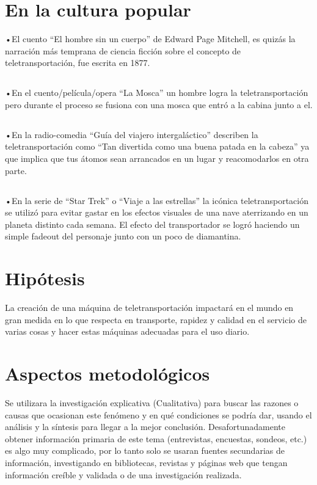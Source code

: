 \documentclass{bmcart}
\begin{document}
\section*{En la cultura popular}
•El cuento “El hombre sin un cuerpo” de Edward Page Mitchell, es quizás la narración más temprana de ciencia ficción sobre el concepto de teletransportación, fue escrita en 1877.
\subsection*{}
•En el cuento/película/opera “La Mosca” un hombre logra la teletransportación pero durante el proceso se fusiona con una mosca que entró a la cabina junto a el.
\subsection*{}
•En la radio-comedia “Guía del viajero intergaláctico” describen la teletransportación como “Tan divertida como una buena patada en la cabeza” ya que implica que tus átomos sean arrancados en un lugar y reacomodarlos en otra parte.
\subsection*{}
•En la serie de “Star Trek” o “Viaje a las estrellas” la icónica teletransportación se utilizó para evitar gastar en los efectos visuales de una nave aterrizando en un planeta distinto cada semana. El efecto del transportador se logró haciendo un simple fadeout del personaje junto con un poco de diamantina.
\section*{Hipótesis}
La creación de una máquina de teletransportación impactará en el mundo en gran medida en lo que respecta en transporte, rapidez y calidad en el servicio de varias cosas y hacer estas máquinas adecuadas para el uso diario.
\section*{Aspectos metodológicos}
Se utilizara la investigación explicativa (Cualitativa) para buscar las razones o causas que ocasionan este fenómeno y en qué condiciones se podría dar, usando el análisis y la síntesis para llegar a la mejor conclusión.
Desafortunadamente obtener información primaria de este tema (entrevistas, encuestas, sondeos, etc.) es algo muy complicado, por lo tanto solo se usaran fuentes secundarias de información, investigando en bibliotecas, revistas y páginas web que tengan información creíble y validada o de una investigación realizada.
\end{document}
